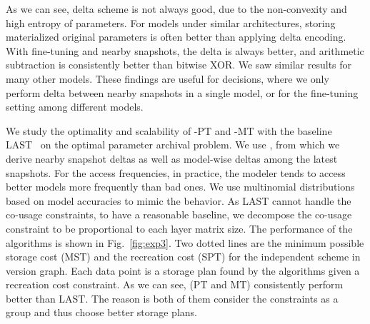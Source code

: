\documentclass[conference]{IEEEtran}
\begin{document}
As we can see, delta scheme is not always good, due to the non-convexity and high entropy of parameters. For models under similar architectures, storing materialized original parameters is often better than applying delta encoding. With fine-tuning and nearby snapshots, the delta is always better, and arithmetic subtraction is consistently better than bitwise XOR. We saw similar results for many other models. These findings are useful for \weightstore\implementation decisions, where we only perform delta between nearby snapshots in a single model, or for the fine-tuning setting among different models.




We study the optimality and scalability of \weightstore-PT and \weightstore-MT with the baseline LAST~\cite{khuller1995balancing} on the optimal parameter archival problem. We use \syntheticds\here, from which we derive nearby snapshot deltas as well as model-wise deltas among the latest snapshots.  For the access frequencies, in practice, the modeler tends to access better models more frequently than bad ones. We use  multinomial distributions based on model accuracies to mimic the behavior. 
As LAST cannot handle the co-usage constraints, to have a reasonable baseline, we decompose the co-usage constraint to be proportional to each layer matrix size. The performance of the algorithms %
is shown in Fig.~\ref{fig:exp3}. Two dotted lines are the minimum possible storage cost (MST) and the recreation cost (SPT) for the independent scheme in version graph. Each data point is a storage plan found by the algorithms given a recreation cost constraint. As we can see, \weightstore\algorithms (PT and MT) consistently perform better than LAST. The reason is both of them consider the constraints as a group and thus choose better storage plans.
\end{document}
